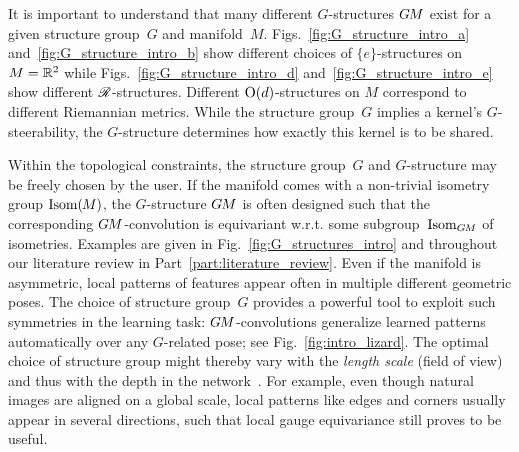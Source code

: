 It is important to understand that many different $G$-structures $G\mkern-1.4muM$ exist
for a given structure group~$G$ and manifold~$M$.
Figs.~\ref{fig:G_structure_intro_a} and~\ref{fig:G_structure_intro_b} show different choices of $\{e\}$-structures on $M=\mathbb{R}^2$ while
Figs.~\ref{fig:G_structure_intro_d} and~\ref{fig:G_structure_intro_e} show different $\mathscr{R}$-structures.
Different $\operatorname{O}(d)$-structures on $M$ correspond to different Riemannian metrics.
While the structure group~$G$ implies a kernel's $G$-steerability, the $G$-structure determines how exactly this kernel is to be shared.


Within the topological constraints,
the structure group~$G$ and $G$-structure may be freely chosen by the user.
If the manifold comes with a non-trivial isometry group $\operatorname{Isom}(\mkern-1.5mu M \mkern-.5mu)$, the $G$-structure $G\mkern-1.4muM$ is often designed such that the corresponding $G\mkern-1.4muM$-convolution is equivariant w.r.t. some subgroup~$\operatorname{Isom}_{G\mkern-1.4muM}$ of isometries.
Examples are given in Fig.~\ref{fig:G_structures_intro} and throughout our literature review in Part~\ref{part:literature_review}.
Even if the manifold is asymmetric, local patterns of features appear often in multiple different geometric poses.
The choice of structure group~$G$ provides a powerful tool to exploit such symmetries in the learning task:
$G\mkern-1.4muM$-convolutions generalize learned patterns automatically over any $G$-related pose; see Fig.~\ref{fig:intro_lizard}.
The optimal choice of structure group might thereby vary with the \emph{length scale} (field of view) and thus with the depth in the network~\cite{Weiler2019_E2CNN}.
For example, even though natural images are aligned on a global scale, local patterns like edges and corners usually appear in several directions, such that local gauge equivariance still proves to be useful.
